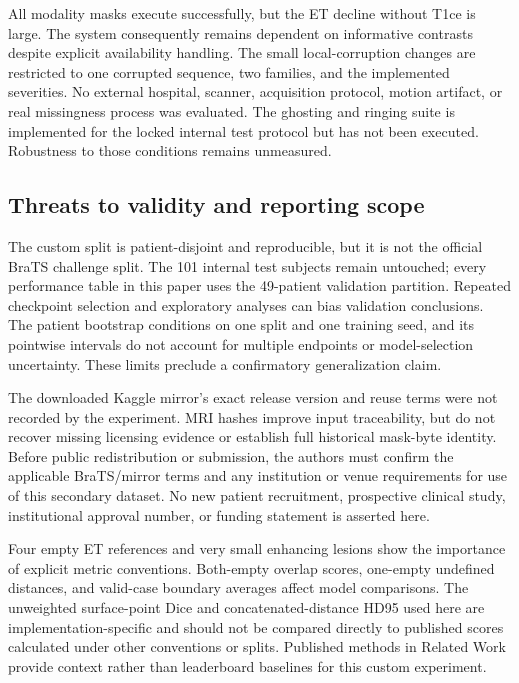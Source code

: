 \documentclass[conference]{IEEEtran}
\begin{document}
All modality masks execute successfully, but the ET decline without T1ce is large. The system consequently remains dependent on informative contrasts despite explicit availability handling. The small local-corruption changes are restricted to one corrupted sequence, two families, and the implemented severities. No external hospital, scanner, acquisition protocol, motion artifact, or real missingness process was evaluated. The ghosting and ringing suite is implemented for the locked internal test protocol but has not been executed. Robustness to those conditions remains unmeasured.

\subsection{Threats to validity and reporting scope}
The custom split is patient-disjoint and reproducible, but it is not the official BraTS challenge split. The 101 internal test subjects remain untouched; every performance table in this paper uses the 49-patient validation partition. Repeated checkpoint selection and exploratory analyses can bias validation conclusions. The patient bootstrap conditions on one split and one training seed, and its pointwise intervals do not account for multiple endpoints or model-selection uncertainty. These limits preclude a confirmatory generalization claim.

The downloaded Kaggle mirror's exact release version and reuse terms were not recorded by the experiment. MRI hashes improve input traceability, but do not recover missing licensing evidence or establish full historical mask-byte identity. Before public redistribution or submission, the authors must confirm the applicable BraTS/mirror terms and any institution or venue requirements for use of this secondary dataset. No new patient recruitment, prospective clinical study, institutional approval number, or funding statement is asserted here.

Four empty ET references and very small enhancing lesions show the importance of explicit metric conventions. Both-empty overlap scores, one-empty undefined distances, and valid-case boundary averages affect model comparisons. The unweighted surface-point Dice and concatenated-distance HD95 used here are implementation-specific and should not be compared directly to published scores calculated under other conventions or splits. Published methods in Related Work provide context rather than leaderboard baselines for this custom experiment.
\end{document}
